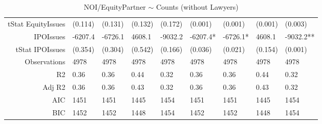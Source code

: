 \begin{table}[ht]
\begin{tabular}{rllllllll}
  tStat EquityIssues & (0.114) & (0.131) & (0.132) & (0.172) & (0.001) & (0.001) & (0.001) & (0.003) \\ 
  IPOIssues & -6207.4 & -6726.1 & 4608.1 & -9032.2 & -6207.4* & -6726.1* & 4608.1 & -9032.2** \\ 
  tStat IPOIssues & (0.354) & (0.304) & (0.542) & (0.166) & (0.036) & (0.021) & (0.154) & (0.001) \\ 
  Observations & 4978 & 4978 & 4978 & 4978 & 4978 & 4978 & 4978 & 4978 \\ 
  R2 & 0.36 & 0.36 & 0.44 & 0.32 & 0.36 & 0.36 & 0.44 & 0.32 \\ 
  Adj R2 & 0.36 & 0.36 & 0.43 & 0.32 & 0.36 & 0.36 & 0.43 & 0.32 \\ 
  AIC & 1451 & 1451 & 1445 & 1454 & 1451 & 1451 & 1445 & 1454 \\ 
  BIC & 1452 & 1452 & 1448 & 1454 & 1452 & 1452 & 1448 & 1454 \\ 
   \hline
\end{tabular}
\caption{NOI/EquityPartner $\sim$ Counts (without Lawyers)} 
\end{table}
